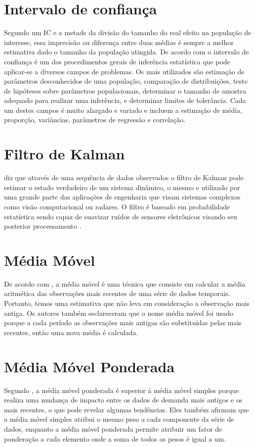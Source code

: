 \section{Intervalo de confiança}
Segundo \cite{patino2015intervalos} um IC e a metade da divisão do tamanho do real efeito na população de interesse, essa imprecisão ou diferença entre duas médias é sempre a melhor estimativa dado o tamanho da população atingida. De acordo com \cite{henriques2011dificuldades} o intervalo de confiança é um dos procedimentos gerais de inferência estatística que pode aplicar-se a diversos campos de problemas. Os mais utilizados são estimação de parâmetros desconhecidos de uma população, comparação de distribuições, teste de hipóteses sobre parâmetros populacionais, determinar o tamanho de amostra adequado para realizar uma inferência, e determinar limites de tolerância. Cada um destes campos é muito alargado e variado e incluem a estimação de média, proporção, variâncias, parâmetros de regressão e correlação.  


\section{ Filtro de Kalman}
\cite{tan2005sensoclean} diz que através de uma sequência de dados observados o filtro de Kalman pode estimar o estado verdadeiro de um sistema dinâmico, o mesmo e utilizado por uma grande parte das aplicações de engenharia que visam sistemas complexos como visão computacional ou radares. O filtro é baseado em probabilidade estatística sendo capaz de suavizar ruídos de sensores eletrônicos visando seu posterior processamento \cite{International_Conference__Zhuang}.
 

\section{Média Móvel}
De acordo com \cite{santos2021educaccao}, a média móvel é uma técnica que consiste em calcular a média aritmética das observações mais recentes de uma série de dados temporais. Portanto, temos uma estimativa que não leva em consideração a observação mais antiga. Os autores também esclareceram que o nome média móvel foi usado porque a cada período as observações mais antigas são substituídas pelas mais recentes, então uma nova média é calculada.


\section{Média Móvel Ponderada}
Segundo \cite{ribeiro2020analise}, a média móvel ponderada é superior à média móvel simples porque realiza uma mudança de impacto entre os dados de demanda mais antigos e os mais recentes, o que pode revelar algumas tendências. Eles também afirmam que a média móvel simples atribui o mesmo peso a cada componente da série de dados, enquanto a média móvel ponderada permite atribuir um fator de ponderação a cada elemento onde a soma de todos os pesos é igual a um.




